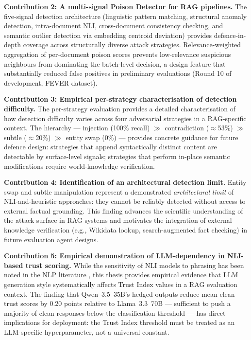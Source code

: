 \textbf{Contribution 2: A multi-signal Poison Detector for RAG pipelines.}
The five-signal detection architecture (linguistic pattern matching, structural anomaly detection, intra-document NLI, cross-document consistency checking, and semantic outlier detection via embedding centroid deviation) provides defence-in-depth coverage across structurally diverse attack strategies. Relevance-weighted aggregation of per-document poison scores prevents low-relevance suspicious neighbours from dominating the batch-level decision, a design feature that substantially reduced false positives in preliminary evaluations (Round 10 of development, FEVER dataset).

\textbf{Contribution 3: Empirical per-strategy characterisation of detection difficulty.}
The per-strategy evaluation provides a detailed characterisation of how detection difficulty varies across four adversarial strategies in a RAG-specific context. The hierarchy --- injection (100\% recall) $\gg$ contradiction ($\approx$53\%) $\gg$ subtle ($\approx$20\%) $\gg$ entity swap (0\%) --- provides concrete guidance for future defence design: strategies that append syntactically distinct content are detectable by surface-level signals; strategies that perform in-place semantic modifications require world-knowledge verification.

\textbf{Contribution 4: Identification of an architectural detection limit.}
Entity swap and subtle manipulation represent a demonstrated \textit{architectural limit} of NLI-and-heuristic approaches: they cannot be reliably detected without access to external factual grounding. This finding advances the scientific understanding of the attack surface in RAG systems and motivates the integration of external knowledge verification (e.g., Wikidata lookup, search-augmented fact checking) in future evaluation agent designs.

\textbf{Contribution 5: Empirical demonstration of LLM-dependency in NLI-based trust scoring.}
While the sensitivity of NLI models to phrasing has been noted in the NLP literature \parencite{honovich2022true}, this thesis provides empirical evidence that LLM generation style systematically affects Trust Index values in a RAG evaluation context. The finding that Qwen~3.5~35B's hedged outputs reduce mean clean trust scores by 0.20 points relative to Llama~3.3~70B --- sufficient to push a majority of clean responses below the classification threshold --- has direct implications for deployment: the Trust Index threshold must be treated as an LLM-specific hyperparameter, not a universal constant.

